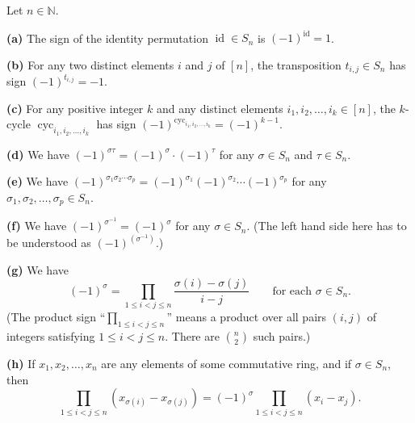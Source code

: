 \begin{proposition}
\label{prop.perm.sign.props}
\leantarget
\leanok
Let $n \in \mathbb{N}$.

\textbf{(a)} The sign of the identity permutation $\operatorname{id} \in S_n$
is $(-1)^{\operatorname{id}} = 1$.

\textbf{(b)} For any two distinct elements $i$ and $j$ of $[n]$, the
transposition $t_{i,j} \in S_n$ has sign $(-1)^{t_{i,j}} = -1$.

\textbf{(c)} For any positive integer $k$ and any distinct elements
$i_1, i_2, \ldots, i_k \in [n]$, the $k$-cycle
$\operatorname{cyc}_{i_1, i_2, \ldots, i_k}$ has sign
$(-1)^{\operatorname{cyc}_{i_1, i_2, \ldots, i_k}} = (-1)^{k-1}$.

\textbf{(d)} We have $(-1)^{\sigma\tau} = (-1)^{\sigma} \cdot (-1)^{\tau}$
for any $\sigma \in S_n$ and $\tau \in S_n$.

\textbf{(e)} We have $(-1)^{\sigma_1 \sigma_2 \cdots \sigma_p}
= (-1)^{\sigma_1} (-1)^{\sigma_2} \cdots (-1)^{\sigma_p}$
for any $\sigma_1, \sigma_2, \ldots, \sigma_p \in S_n$.

\textbf{(f)} We have $(-1)^{\sigma^{-1}} = (-1)^{\sigma}$
for any $\sigma \in S_n$. (The left hand side here has to be
understood as $(-1)^{(\sigma^{-1})}$.)

\textbf{(g)} We have
\[
(-1)^{\sigma} = \prod_{1 \leq i < j \leq n}
\frac{\sigma(i) - \sigma(j)}{i - j}
\qquad \text{for each } \sigma \in S_n.
\]
(The product sign ``$\prod_{1 \leq i < j \leq n}$'' means a product over
all pairs $(i,j)$ of integers satisfying $1 \leq i < j \leq n$.
There are $\binom{n}{2}$ such pairs.)

\textbf{(h)} If $x_1, x_2, \ldots, x_n$ are any elements of some
commutative ring, and if $\sigma \in S_n$, then
\[
\prod_{1 \leq i < j \leq n}
\left( x_{\sigma(i)} - x_{\sigma(j)} \right)
= (-1)^{\sigma}
\prod_{1 \leq i < j \leq n}
\left( x_i - x_j \right).
\]
\end{proposition}

